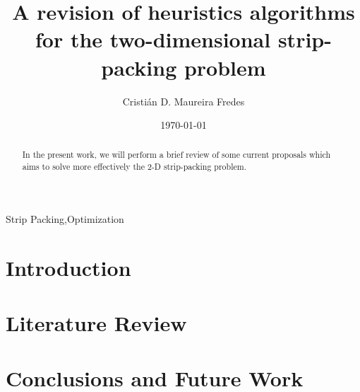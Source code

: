 \documentclass[preprint,authoryear,12pt]{elsarticle}
\begin{document}
\begin{frontmatter}

\title{A revision of heuristics algorithms for the two-dimensional strip-packing problem}
\author[utfsm]{Cristián D. Maureira Fredes}


\address[utfsm]{Departamento de Informática, Universidad Técnica Federico Santa María, Av. España 1680, Valparaiso, Chile}
\date{\today}

\begin{abstract}
In the present work,
we will perform a brief review of some current proposals
which aims to solve more effectively the 2-D strip-packing problem.
\end{abstract}

\begin{keyword}
Strip Packing\sep Optimization
\end{keyword}

\end{frontmatter}

\section{Introduction}
\label{introduction}



\section{Literature Review}
\label{stateofart}



\section{Conclusions and Future Work}
\label{conclusions}




\end{document}
